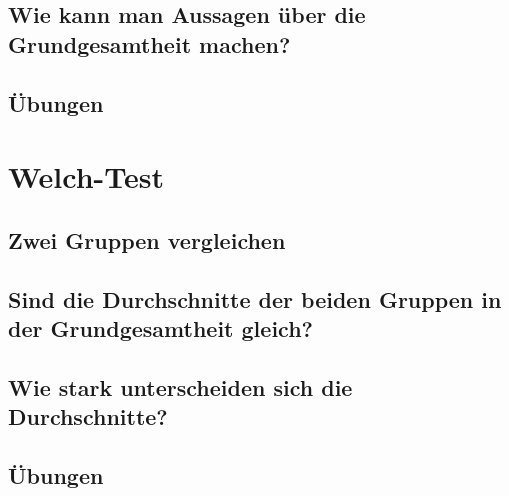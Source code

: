 \documentclass[
]{book}
\begin{document}
\section{Wie kann man Aussagen über die Grundgesamtheit machen?}\label{wie-kann-man-aussagen-uxfcber-die-grundgesamtheit-machen-1}

\section{Übungen}\label{uxfcbungen-4}

\chapter{Welch-Test}\label{welch-test}

\section{Zwei Gruppen vergleichen}\label{zwei-gruppen-vergleichen-1}

\section{Sind die Durchschnitte der beiden Gruppen in der Grundgesamtheit gleich?}\label{sind-die-durchschnitte-der-beiden-gruppen-in-der-grundgesamtheit-gleich}

\section{Wie stark unterscheiden sich die Durchschnitte?}\label{wie-stark-unterscheiden-sich-die-durchschnitte}

\section{Übungen}\label{uxfcbungen-5}

  
\end{document}

